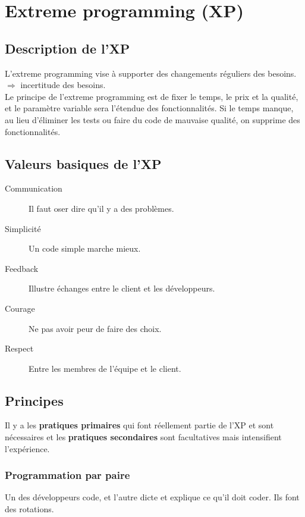 \section{Extreme programming (XP)}



\subsection{Description de l'XP}
L’extreme programming vise à supporter des changements réguliers des besoins.\\
$\Rightarrow$ incertitude des besoins.\\
Le principe de l’extreme programming est de fixer le temps, le prix et la qualité, et le paramètre variable sera l’étendue des fonctionnalités. Si le temps manque, au lieu d’éliminer les tests ou faire du code de mauvaise qualité, on supprime des fonctionnalités.



\subsection{Valeurs basiques de l'XP}
\begin{description}
	\item [Communication] Il faut oser dire qu’il y a des problèmes.
	\item [Simplicité] Un code simple marche mieux.
	\item [Feedback] Illustre échanges entre le client et les développeurs.
	\item [Courage] Ne pas avoir peur de faire des choix.
	\item [Respect] Entre les membres de l’équipe et le client.
\end{description}



\subsection{Principes}
Il y a les \textbf{pratiques primaires} qui font réellement partie de l’XP et sont nécessaires et les \textbf{pratiques secondaires} sont facultatives mais intensifient l’expérience.



\subsubsection{Programmation par paire}
Un des développeurs code, et l’autre dicte et explique ce qu’il doit coder. Ils font des rotations.



